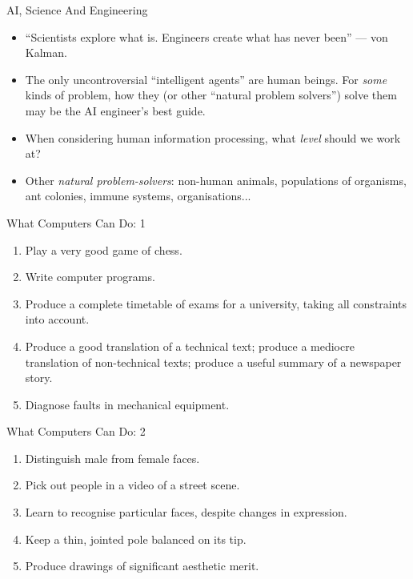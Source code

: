\documentclass{article}
\begin{document}
\begin{slide}{}
{\Large AI, Science And Engineering}
\begin{itemize}
\item ``Scientists explore what is. Engineers create what has never
been'' --- von Kalman.
\item The only uncontroversial
``intelligent agents'' are human beings. For {\em some} kinds of
problem, how they (or other
``natural problem solvers'') solve them may be the AI engineer's best guide. 
\item When considering human information processing, what {\em level}
should we work at?
\item Other {\em natural problem-solvers}: non-human animals,
populations of organisms, ant colonies, immune systems,
organisations...
\end{itemize}
\end{slide}

\begin{slide}{}
{\Large What Computers Can Do: 1}
\begin{enumerate}
\item Play a very good game of chess.
\item Write computer programs.
\item Produce a complete timetable of exams for a university, taking
all constraints into account.
\item Produce a good translation of a technical text; produce a
mediocre translation of non-technical texts; produce a useful summary
of a newspaper story.
\item Diagnose faults in mechanical equipment.
\end{enumerate}
\end{slide}

\begin{slide}{}
{\Large What Computers Can Do: 2}
\begin{enumerate}
\item Distinguish male from female faces. 
\item Pick out people in a video of a street scene.
\item Learn to recognise particular faces, despite changes in expression.
\item Keep a thin, jointed pole balanced on its tip.
\item Produce drawings of significant aesthetic merit.
\end{enumerate}
\end{slide}
\end{document}
